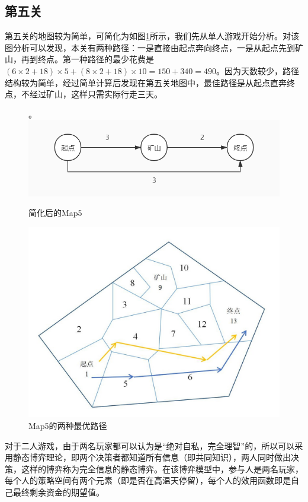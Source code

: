 \documentclass[withoutpre]{cumcmthesis} %
\begin{document}
\subsection{第五关}
第五关的地图较为简单，可简化为如图\cref{fig:map5}所示，我们先从单人游戏开始分析。对该图分析可以发现，本关有两种路径：一是直接由起点奔向终点，一是从起点先到矿山，再到终点。第一种路径的最少花费是$(6\times2+18)\times5+(8\times2+18)\times10=150+340=490$。因为天数较少，路径结构较为简单，经过简单计算后发现在第五关地图中，最佳路径是从起点直奔终点，不经过矿山，这样只需实际行走三天。
\begin{figure}[H]
	\centering。
	\includegraphics[scale=0.5]{figures/map3.jpg}
	\caption{简化后的Map5}
	\label{fig:map5}
\end{figure}
\begin{figure}[H]
	\centering
	\includegraphics[scale=0.5]{figures/map5path}
	\caption{Map5的两种最优路径}	
\end{figure}
对于二人游戏，由于两名玩家都可以认为是“绝对自私，完全理智”的，所以可以采用静态博弈理论，即两个决策者都知道所有信息（即共同知识），两人同时做出决策，这样的博弈称为完全信息的静态博弈。在该博弈模型中，参与人是两名玩家，每个人的策略空间有两个元素（即是否在高温天停留），每个人的效用函数即是自己最终剩余资金的期望值。
\end{document}
